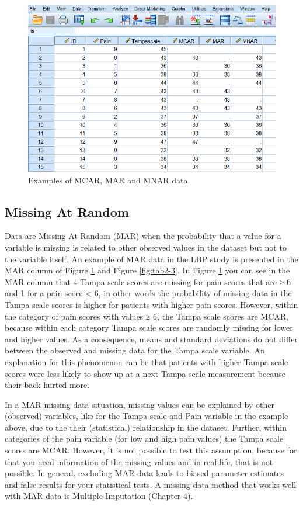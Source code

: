 \documentclass[]{book}
\begin{document}
\begin{figure}

{\centering \includegraphics[width=0.9\linewidth]{images/fig2.7} 

}

\caption{Examples of MCAR, MAR and MNAR data.}\label{fig:fig2-7}
\end{figure}

\subsection{Missing At Random}\label{missing-at-random}

Data are Missing At Random (MAR) when the probability that a value for a
variable is missing is related to other observed values in the dataset
but not to the variable itself. An example of MAR data in the LBP study
is presented in the MAR column of Figure \ref{fig:fig2-7} and Figure
\ref{fig:tab2-3}. In Figure \ref{fig:fig2-7} you can see in the MAR
column that 4 Tampa scale scores are missing for pain scores that are ≥
6 and 1 for a pain score \textless{} 6, in other words the probability
of missing data in the Tampa scale scores is higher for patients with
higher pain scores. However, within the category of pain scores with
values ≥ 6, the Tampa scale scores are MCAR, because within each
category Tampa scale scores are randomly missing for lower and higher
values. As a consequence, means and standard deviations do not differ
between the observed and missing data for the Tampa scale variable. An
explanation for this phenomenon can be that patients with higher Tampa
scale scores were less likely to show up at a next Tampa scale
measurement because their back hurted more.

In a MAR missing data situation, missing values can be explained by
other (observed) variables, like for the Tampa scale and Pain variable
in the example above, due to the their (statistical) relationship in the
dataset. Further, within categories of the pain variable (for low and
high pain values) the Tampa scale scores are MCAR. However, it is not
possible to test this assumption, because for that you need information
of the missing values and in real-life, that is not possible. In
general, excluding MAR data leads to biased parameter estimates and
false results for your statistical tests. A missing data method that
works well with MAR data is Multiple Imputation (Chapter 4).
\end{document}
